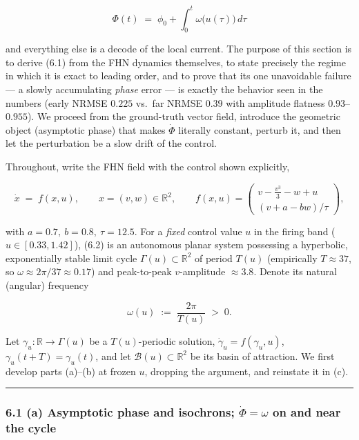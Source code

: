 \documentclass[
  11pt,
]{article}
\providecommand{\gt}{>}
\begin{document}
\[
\Phi(t)\;=\;\phi_0+\int_0^t \omega\big(u(\tau)\big)\,d\tau
\tag{6.1}
\]

and everything else is a decode of the local current. The purpose of
this section is to derive (6.1) from the FHN dynamics themselves, to
state precisely the regime in which it is exact to leading order, and to
prove that its one unavoidable failure --- a slowly accumulating
\emph{phase} error --- is exactly the behavior seen in the numbers
(early NRMSE \(0.225\) vs.~far NRMSE \(0.39\) with amplitude flatness
\(0.93\)--\(0.955\)). We proceed from the ground-truth vector field,
introduce the geometric object (asymptotic phase) that makes
\(\dot\Phi\) literally constant, perturb it, and then let the
perturbation be a slow drift of the control.

Throughout, write the FHN field with the control shown explicitly,

\[
\dot x \;=\; f(x,u),\qquad
x=(v,w)\in\mathbb{R}^2,\qquad
f(x,u)=\begin{pmatrix} v-\tfrac{v^3}{3}-w+u\\[2pt] (v+a-bw)/\tau\end{pmatrix},
\tag{6.2}
\]

with \(a=0.7,\ b=0.8,\ \tau=12.5\). For a \emph{fixed} control value
\(u\) in the firing band (\(u\in[0.33,1.42]\)), (6.2) is an autonomous
planar system possessing a hyperbolic, exponentially stable limit cycle
\(\Gamma(u)\subset\mathbb{R}^2\) of period \(T(u)\) (empirically
\(T\approx 37\), so \(\omega\approx 2\pi/37\approx 0.17\)) and
peak-to-peak \(v\)-amplitude \(\approx 3.8\). Denote its natural
(angular) frequency

\[
\omega(u)\;:=\;\frac{2\pi}{T(u)}\;\gt \;0 .
\]

Let \(\gamma_u:\mathbb{R}\to\Gamma(u)\) be a \(T(u)\)-periodic solution,
\(\dot\gamma_u=f(\gamma_u,u)\), \(\gamma_u(t+T)=\gamma_u(t)\), and let
\(\mathcal B(u)\subset\mathbb{R}^2\) be its basin of attraction. We
first develop parts (a)--(b) at frozen \(u\), dropping the argument, and
reinstate it in (c).

\begin{center}\rule{0.5\linewidth}{0.5pt}\end{center}

\subsubsection{\texorpdfstring{6.1 (a) Asymptotic phase and isochrons;
\(\dot\Phi=\omega\) on and near the
cycle}{6.1 (a) Asymptotic phase and isochrons; \textbackslash dot\textbackslash Phi=\textbackslash omega on and near the cycle}}\label{a-asymptotic-phase-and-isochrons-dotphiomega-on-and-near-the-cycle}
\end{document}
